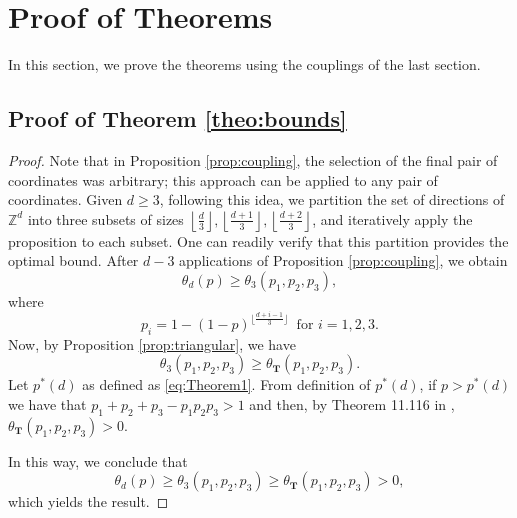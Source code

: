 \documentclass{aptpub}
\newcommand{\Z}{\mathbb{Z}}
\begin{document}
\section{Proof of Theorems}\label{sec:proofs}
In this section, we prove the theorems using the couplings of the last section.%

\subsection{Proof of Theorem \ref{theo:bounds}}



\begin{proof}
Note that in Proposition \ref{prop:coupling}, the selection of the final pair of coordinates was arbitrary; this approach can be applied to any pair of coordinates. Given $d \geq 3$, following this idea, we partition the set of directions of $\Z^d$ into three subsets of sizes $\left \lfloor\frac{d}{3} \right\rfloor, \left\lfloor\frac{d+1}{3}\right\rfloor, \left\lfloor\frac{d+2}{3}\right\rfloor$, and iteratively apply the proposition to each subset. One can readily verify that this partition provides the optimal bound. After $d-3$ applications of Proposition \ref{prop:coupling}, we obtain
\begin{equation*}
    \theta_d(p)\geq\theta_3(p_1,p_2,p_3),
\end{equation*}
where
\begin{equation*}
    p_i=1-(1-p)^{\lfloor \frac{d+i-1}{3}\rfloor} \: \text{ for } i=1,2,3.
\end{equation*} 
Now, by Proposition \ref{prop:triangular}, we have 
\begin{equation*}
    \theta_3(p_1,p_2,p_3)\geq \theta_{\mathbf{T}}(p_1,p_2,p_3).
\end{equation*}
Let $p^*(d)$ as defined as \eqref{eq:Theorem1}. From definition of $p^*(d)$, if $p>p^{\ast}(d)$ we have that $ p_1 + p_2 + p_3 - p_1p_2p_3 > 1$ and then, by Theorem 11.116 in \cite{Grim},  $\theta_{\mathbf{T}}(p_1,p_2,p_3)>0$.

In this way, we conclude that 
\begin{equation*} 
\theta_d(p)\geq\theta_3(p_1,p_2,p_3) \geq  \theta_{\mathbf{T}}(p_1,p_2,p_3)>0, 
\end{equation*}
which yields the result.
\end{proof}
\end{document}
